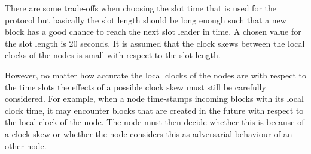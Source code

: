 There are some trade-offs when choosing the slot time that is used for the protocol but
basically the slot length should be long enough such that a new block has a good chance to reach the
next slot leader in time.
A chosen value for the slot length is 20 seconds.
It is assumed that the clock skews between the local clocks of the nodes is small with respect to the
slot length.

However, no matter how accurate the local clocks of the nodes are with respect to the time slots
the effects of a possible clock skew must still be carefully considered.
For example, when a node time-stamps incoming blocks with its local clock time, it may encounter
blocks that are created in the future
with respect to the local clock of the node.
The node must then decide whether this is because of a clock skew or whether the node considers this
as adversarial behaviour of an other node.

